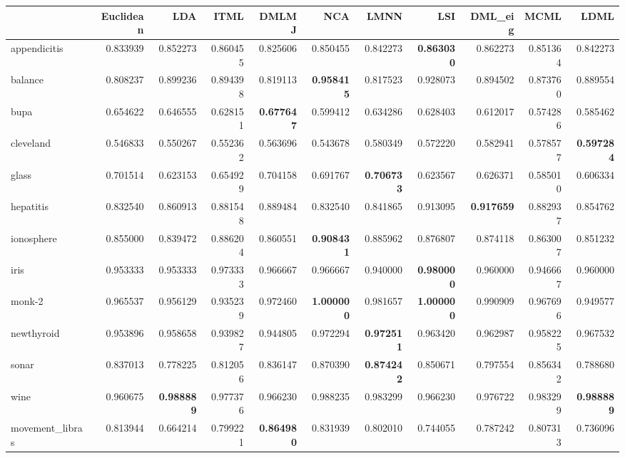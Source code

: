 \begin{tabular}{lrrrrrrrrrr}
\toprule
{} &  Euclidean &       LDA &      ITML &     DMLMJ &       NCA &      LMNN &       LSI &   DML\_eig &      MCML &      LDML \\
\midrule
appendicitis    &   0.833939 &  0.852273 &  0.860455 &  0.825606 &  0.850455 &  0.842273 &  \textbf{0.863030} &  0.862273 &  0.851364 &  0.842273 \\
balance         &   0.808237 &  0.899236 &  0.894398 &  0.819113 &  \textbf{0.958415} &  0.817523 &  0.928073 &  0.894502 &  0.873760 &  0.889554 \\
bupa            &   0.654622 &  0.646555 &  0.628151 &  \textbf{0.677647} &  0.599412 &  0.634286 &  0.628403 &  0.612017 &  0.574286 &  0.585462 \\
cleveland       &   0.546833 &  0.550267 &  0.552362 &  0.563696 &  0.543678 &  0.580349 &  0.572220 &  0.582941 &  0.578577 &  \textbf{0.597284} \\
glass           &   0.701514 &  0.623153 &  0.654929 &  0.704158 &  0.691767 &  \textbf{0.706733} &  0.623567 &  0.626371 &  0.585010 &  0.606334 \\
hepatitis       &   0.832540 &  0.860913 &  0.881548 &  0.889484 &  0.832540 &  0.841865 &  0.913095 &  \textbf{0.917659} &  0.882937 &  0.854762 \\
ionosphere      &   0.855000 &  0.839472 &  0.886204 &  0.860551 &  \textbf{0.908431} &  0.885962 &  0.876807 &  0.874118 &  0.863007 &  0.851232 \\
iris            &   0.953333 &  0.953333 &  0.973333 &  0.966667 &  0.966667 &  0.940000 &  \textbf{0.980000} &  0.960000 &  0.946667 &  0.960000 \\
monk-2          &   0.965537 &  0.956129 &  0.935239 &  0.972460 &  \textbf{1.000000} &  0.981657 &  \textbf{1.000000} &  0.990909 &  0.967696 &  0.949577 \\
newthyroid      &   0.953896 &  0.958658 &  0.939827 &  0.944805 &  0.972294 &  \textbf{0.972511} &  0.963420 &  0.962987 &  0.958225 &  0.967532 \\
sonar           &   0.837013 &  0.778225 &  0.812056 &  0.836147 &  0.870390 &  \textbf{0.874242} &  0.850671 &  0.797554 &  0.856342 &  0.788680 \\
wine            &   0.960675 &  \textbf{0.988889} &  0.977376 &  0.966230 &  0.988235 &  0.983299 &  0.966230 &  0.976722 &  0.983299 &  \textbf{0.988889} \\
movement\_libras &   0.813944 &  0.664214 &  0.799221 &  \textbf{0.864980} &  0.831939 &  0.802010 &  0.744055 &  0.787242 &  0.807313 &  0.736096 \\

\end{tabular}

